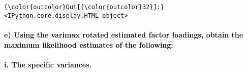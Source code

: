 \documentclass[11pt]{article}
\begin{document}
\begin{Verbatim}[commandchars=\\\{\}]
{\color{outcolor}Out[{\color{outcolor}32}]:} <IPython.core.display.HTML object>
\end{Verbatim}
            
    \hypertarget{e-using-the-varimax-rotated-estimated-factor-loadings-obtain-the-maximum-likelihood-estimates-of-the-following}{%
\paragraph{e) Using the varimax rotated estimated factor loadings,
obtain the maximum likelihood estimates of the
following:}\label{e-using-the-varimax-rotated-estimated-factor-loadings-obtain-the-maximum-likelihood-estimates-of-the-following}}

\hypertarget{i.-the-specific-variances.}{%
\paragraph{i. The specific
variances.}\label{i.-the-specific-variances.}}
\end{document}
